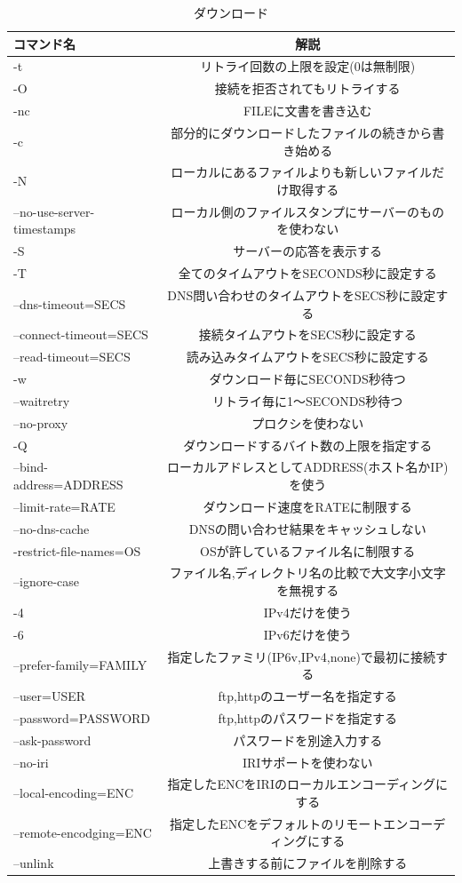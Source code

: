 \begin{table}[H]
  \begin{center}
    \caption{ダウンロード}
    \begin{tabular}{|l|c|} \hline
      コマンド名 & 解説  \\ \hline
      -t & リトライ回数の上限を設定(0は無制限)  \\
      -O & 接続を拒否されてもリトライする  \\
      -nc & FILEに文書を書き込む  \\
-c & 部分的にダウンロードしたファイルの続きから書き始める  \\
-N & ローカルにあるファイルよりも新しいファイルだけ取得する  \\
--no-use-server-timestamps & ローカル側のファイルスタンプにサーバーのものを使わない  \\
-S & サーバーの応答を表示する  \\
-T & 全てのタイムアウトをSECONDS秒に設定する  \\
--dns-timeout=SECS & DNS問い合わせのタイムアウトをSECS秒に設定する  \\
--connect-timeout=SECS & 接続タイムアウトをSECS秒に設定する  \\
--read-timeout=SECS & 読み込みタイムアウトをSECS秒に設定する  \\
-w & ダウンロード毎にSECONDS秒待つ  \\
--waitretry & リトライ毎に1～SECONDS秒待つ  \\
--no-proxy & プロクシを使わない  \\
-Q & ダウンロードするバイト数の上限を指定する  \\
--bind-address=ADDRESS & ローカルアドレスとしてADDRESS(ホスト名かIP)を使う  \\
--limit-rate=RATE & ダウンロード速度をRATEに制限する  \\
--no-dns-cache & DNSの問い合わせ結果をキャッシュしない  \\
-restrict-file-names=OS & OSが許しているファイル名に制限する  \\
--ignore-case & ファイル名,ディレクトリ名の比較で大文字小文字を無視する  \\
-4 & IPv4だけを使う  \\
-6 & IPv6だけを使う  \\
--prefer-family=FAMILY & 指定したファミリ(IP6v,IPv4,none)で最初に接続する  \\
--user=USER & ftp,httpのユーザー名を指定する  \\
--password=PASSWORD & ftp,httpのパスワードを指定する  \\
--ask-password & パスワードを別途入力する  \\
--no-iri & IRIサポートを使わない  \\
--local-encoding=ENC & 指定したENCをIRIのローカルエンコーディングにする  \\
--remote-encodging=ENC & 指定したENCをデフォルトのリモートエンコーディングにする  \\
--unlink & 上書きする前にファイルを削除する  \\ \hline
    \end{tabular}
  \end{center}
\end{table}

